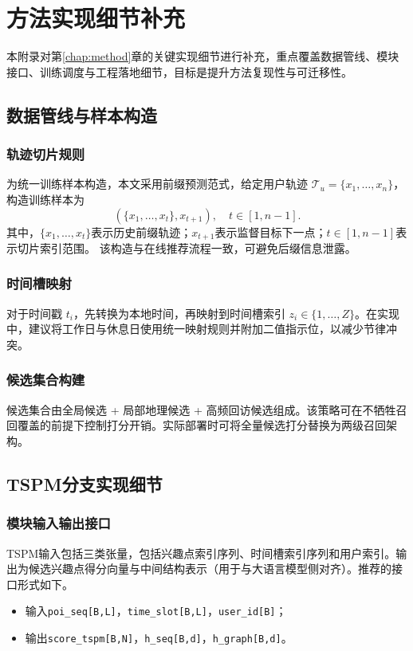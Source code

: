 \chapter{方法实现细节补充}
\label{appx:method}

本附录对第\ref{chap:method}章的关键实现细节进行补充，重点覆盖数据管线、模块接口、训练调度与工程落地细节，目标是提升方法复现性与可迁移性。

\section{数据管线与样本构造}
\subsection{轨迹切片规则}
为统一训练样本构造，本文采用前缀预测范式，给定用户轨迹 $\mathcal{T}_u=\{x_1,\ldots,x_n\}$，构造训练样本为
\begin{equation}
(\{x_1,\ldots,x_t\}, x_{t+1}),\quad t\in[1,n-1].
\end{equation}
其中，$\{x_1,\ldots,x_t\}$表示历史前缀轨迹；$x_{t+1}$表示监督目标下一点；$t\in[1,n-1]$表示切片索引范围。
该构造与在线推荐流程一致，可避免后缀信息泄露。

\subsection{时间槽映射}
对于时间戳 $t_i$，先转换为本地时间，再映射到时间槽索引 $z_i\in\{1,\ldots,Z\}$。在实现中，建议将工作日与休息日使用统一映射规则并附加二值指示位，以减少节律冲突。

\subsection{候选集合构建}
候选集合由全局候选 + 局部地理候选 + 高频回访候选组成。该策略可在不牺牲召回覆盖的前提下控制打分开销。实际部署时可将全量候选打分替换为两级召回架构。

\section{TSPM分支实现细节}
\subsection{模块输入输出接口}
TSPM输入包括三类张量，包括兴趣点索引序列、时间槽索引序列和用户索引。输出为候选兴趣点得分向量与中间结构表示（用于与大语言模型侧对齐）。推荐的接口形式如下。
\begin{itemize}
    \item 输入\texttt{poi\_seq[B,L]}，\texttt{time\_slot[B,L]}，\texttt{user\_id[B]}；
    \item 输出\texttt{score\_tspm[B,N]}，\texttt{h\_seq[B,d]}，\texttt{h\_graph[B,d]}。
\end{itemize}

